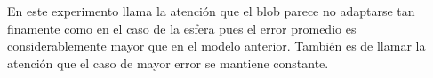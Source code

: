 En este experimento llama la atención que el blob parece no adaptarse tan finamente como en el caso de la esfera pues el error promedio es considerablemente mayor que en el modelo anterior. También es de llamar la atención que el caso de mayor error se mantiene constante.

